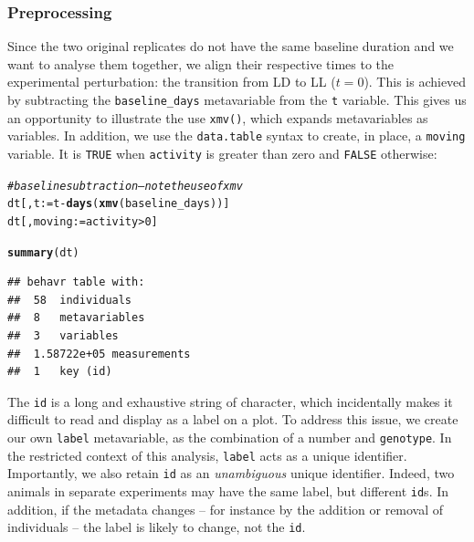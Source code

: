 \documentclass[10pt,letterpaper]{article}\usepackage[]{graphicx}\usepackage[]{color}
\makeatletter
\newcommand{\hlnum}[1]{\textcolor[rgb]{0.686,0.059,0.569}{#1}}%
\newcommand{\hlcom}[1]{\textcolor[rgb]{0.678,0.584,0.686}{\textit{#1}}}%
\newcommand{\hlopt}[1]{\textcolor[rgb]{0,0,0}{#1}}%
\newcommand{\hlstd}[1]{\textcolor[rgb]{0.345,0.345,0.345}{#1}}%
\newcommand{\hlkwb}[1]{\textcolor[rgb]{0.69,0.353,0.396}{#1}}%
\newcommand{\hlkwd}[1]{\textcolor[rgb]{0.737,0.353,0.396}{\textbf{#1}}}%
\newenvironment{kframe}{%
 \def\at@end@of@kframe{}%
 \ifinner\ifhmode%
  \def\at@end@of@kframe{\end{minipage}}%
  \begin{minipage}{\columnwidth}%
 \fi\fi%
 \def\FrameCommand##1{\hskip\@totalleftmargin \hskip-\fboxsep
 \colorbox{shadecolor}{##1}\hskip-\fboxsep
     \hskip-\linewidth \hskip-\@totalleftmargin \hskip\columnwidth}%
 \MakeFramed {\advance\hsize-\width
   \@totalleftmargin\z@ \linewidth\hsize
   \@setminipage}}%
 {\par\unskip\endMakeFramed%
 \at@end@of@kframe}
\newenvironment{knitrout}{}{} %
\makeatother
\begin{document}
\subsubsection*{Preprocessing}
Since the two original replicates do not have the same baseline duration and we want to analyse them together,
we align their respective times to the experimental perturbation: the transition from LD to LL ($t = 0$). 
This is achieved by subtracting the \texttt{baseline\_days} metavariable from the \texttt{t} variable.
This gives us an opportunity to illustrate the use \texttt{xmv()}, which expands metavariables as variables.
In addition, we use the \texttt{data.table} syntax to create, in place, a \texttt{moving} variable.
It is \texttt{TRUE} when \texttt{activity} is greater than zero and \texttt{FALSE} otherwise:

\begin{knitrout}
\color{fgcolor}\begin{kframe}
\begin{alltt}
\hlcom{# baseline subtraction -- note the use of xmv}
\hlstd{dt[,t} \hlkwb{:=} \hlstd{t} \hlopt{-} \hlkwd{days}\hlstd{(}\hlkwd{xmv}\hlstd{(baseline_days))]}
\hlstd{dt[, moving} \hlkwb{:=}  \hlstd{activity} \hlopt{>} \hlnum{0}\hlstd{]}
\end{alltt}
\end{kframe}
\end{knitrout}

\begin{knitrout}
\color{fgcolor}\begin{kframe}
\begin{alltt}
\hlkwd{summary}\hlstd{(dt)}
\end{alltt}
\begin{verbatim}
## behavr table with:
##  58	individuals
##  8	metavariables
##  3	variables
##  1.58722e+05	measurements
##  1	key (id)
\end{verbatim}
\end{kframe}
\end{knitrout}
The \texttt{id} is a long and exhaustive string of character, which incidentally 
makes it difficult to read and display as a label on a plot.
To address this issue, we create our own \texttt{label} metavariable, as the combination of a number and \texttt{genotype}.
In the restricted context of this analysis, \texttt{label} acts as a unique identifier.
Importantly, we also retain \texttt{id} as an \emph{unambiguous} unique identifier.
Indeed, two animals in separate experiments may have the same label, but different \texttt{id}s.
In addition, if the metadata changes -- for instance by the addition or removal of individuals -- the label is likely to change, not the \texttt{id}.
\end{document}
